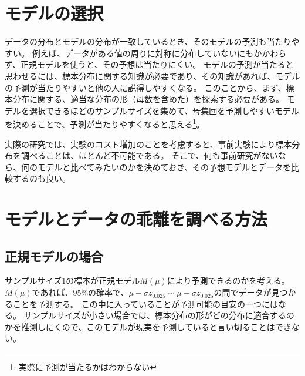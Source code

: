 \section{モデルの選択}
データの分布とモデルの分布が一致しているとき、そのモデルの予測も当たりやすい。
例えば、データがある値の周りに対称に分布していないにもかかわらず、正規モデルを使うと、その予想は当たりにくい。
モデルの予測が当たると思わせるには、標本分布に関する知識が必要であり、その知識があれば、モデルの予測が当たりやすいと他の人に説得しやすくなる。
このことから、まず、標本分布に関する、適当な分布の形（母数を含めた）を探索する必要がある。
モデルを選択できるほどのサンプルサイズを集めて、母集団を予測しやすいモデルを決めることで、予測が当たりやすくなると思える\footnote{実際に予測が当たるかはわからない}。

実際の研究では、実験のコスト増加のことを考慮すると、事前実験により標本分布を調べることは、ほとんど不可能である。
そこで、何も事前研究がないなら、何のモデルと比べてみたいのかを決めておき、その予想モデルとデータを比較するのも良い。
\fi

\section{モデルとデータの乖離を調べる方法}




\subsection{正規モデルの場合}
サンプルサイズ$1$の標本が正規モデル$M(\mu)$により予測できるのかを考える。
$M(\mu)$であれば、$95\%$の確率で、$\mu-\sigma z_{0.025}\sim \mu-\sigma z_{0.025}$の間でデータが見つかることを予測する。
この中に入っていることが予測可能の目安の一つにはなる。
サンプルサイズが小さい場合では、標本分布の形がどの分布に適合するのかを推測しにくので、このモデルが現実を予測していると言い切ることはできない。

